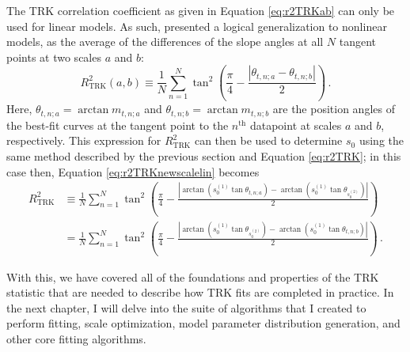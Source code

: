 The TRK correlation coefficient as given in Equation \eqref{eq:r2TRKab} can only be used for linear models. As such, \textcite{trotter} presented a logical generalization to nonlinear models, as the average of the differences of the slope angles at all $N$ tangent points at two scales $a$ and $b$:
\begin{equation}\label{eq:R2TRKgen}
R_{\mathrm{TRK}}^{2}(a,b)\equiv \frac{1}{N}\sum_{n=1}^{N}{\tan^2\left(\frac{\pi}{4}-\frac{\left|\theta_{t,n;a}-\theta_{t,n;b}\right|}{2}\right)} \, .
\end{equation}
Here, $\theta_{t,n;a}=\arctan m_{t,n;a}$ and $\theta_{t,n;b}=\arctan m_{t,n;b}$ are the position angles of the best-fit curves at the tangent point to the $n^\text{th}$ datapoint at scales $a$ and $b$, respectively. This expression for $R_{\mathrm{TRK}}^{2}$ can then be used to determine $s_0$ using the same method described by the previous section and Equation \eqref{eq:r2TRK}; in this case then, Equation \eqref{eq:r2TRKnewscalelin} becomes
\begin{align}\label{eq:r2TRKnewscalenonlin}
R^2_{\mathrm{TRK}} & \equiv \frac{1}{N}\sum_{n=1}^{N}\tan^2\left(\frac{\pi}{4}-\frac{\left|\arctan (s_0^{(1)}\tan\theta_{t,n;a})-\arctan (s_0^{(1)}\tan\theta_{s_0^{(2)}})\right|}{2}\right) \nonumber \\
& =
\frac{1}{N}\sum_{n=1}^{N}\tan^2\left(\frac{\pi}{4}-\frac{\left|\arctan (s_0^{(1)}\tan\theta_{s_0^{(2)}})-\arctan (s_0^{(1)}\tan\theta_{t,n;b})\right|}{2}\right) \, .
\end{align}

With this, we have covered all of the foundations and properties of the TRK statistic that are needed to describe how TRK fits are completed in practice. In the next chapter, I will delve into the suite of algorithms that I created to perform fitting, scale optimization, model parameter distribution generation, and other core fitting algorithms.
